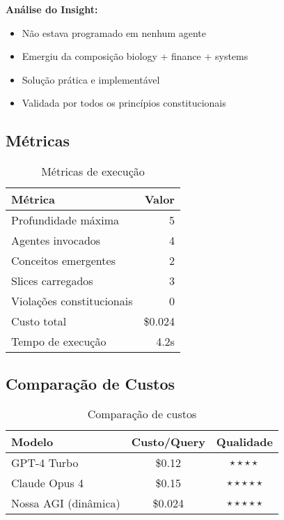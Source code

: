 \documentclass[11pt]{article}
\begin{document}
\textbf{Análise do Insight:}

\begin{itemize}
    \item Não estava programado em nenhum agente
    \item Emergiu da composição biology + finance + systems
    \item Solução prática e implementável
    \item Validada por todos os princípios constitucionais
\end{itemize}

\subsection{Métricas}

\begin{table}[H]
\centering
\begin{tabular}{@{}lr@{}}
\toprule
\textbf{Métrica} & \textbf{Valor} \\ \midrule
Profundidade máxima & 5 \\
Agentes invocados & 4 \\
Conceitos emergentes & 2 \\
Slices carregados & 3 \\
Violações constitucionais & 0 \\
Custo total & \$0.024 \\
Tempo de execução & 4.2s \\ \bottomrule
\end{tabular}
\caption{Métricas de execução}
\end{table}

\subsection{Comparação de Custos}

\begin{table}[H]
\centering
\begin{tabular}{@{}lcc@{}}
\toprule
\textbf{Modelo} & \textbf{Custo/Query} & \textbf{Qualidade} \\ \midrule
GPT-4 Turbo & \$0.12 & $\star\star\star\star$ \\
Claude Opus 4 & \$0.15 & $\star\star\star\star\star$ \\
Nossa AGI (dinâmica) & \$0.024 & $\star\star\star\star\star$ \\ \bottomrule
\end{tabular}
\caption{Comparação de custos}
\end{table}
\end{document}
